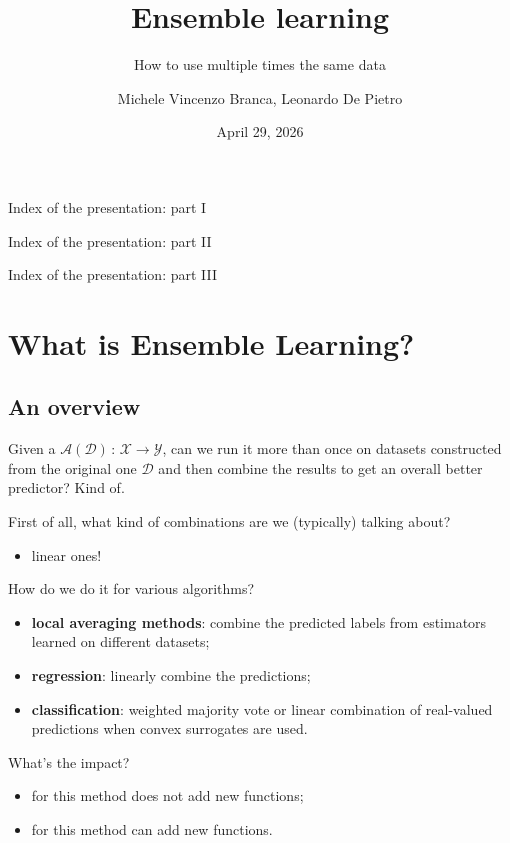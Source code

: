 \documentclass[
11pt,notheorems,hyperref={pdfauthor=whatever}
]{beamer}
\title[
]{Ensemble learning}
\subtitle{How to use multiple times the same data}
\author[
]{
    Michele Vincenzo Branca, Leonardo De Pietro
}
\institute{
    Collegio Carlo Alberto, \\
    University of Turin}
\date{April 29, 2026}
\begin{document}
{
\begin{frame}
  \titlepage
\end{frame}
}
\addtocounter{framenumber}{-1}

\begin{frame}{Index of the presentation: part I}
    \tableofcontents[part=1]
\end{frame}
\begin{frame}{Index of the presentation: part II}
    \tableofcontents[part=2]
\end{frame}
\begin{frame}{Index of the presentation: part III}
    \tableofcontents[part=3]
\end{frame}


\justifying
\section{What is Ensemble Learning?}
\subsection{An overview}
\begin{frame}
    Given a  \(\mathcal{A}(\mathcal{D})\,:\,\mathcal{X}\to\mathcal{Y}\), can we run it more than once on datasets constructed from the original one \(\mathcal{D}\) and then combine the results to get an overall better predictor? Kind of.
    
    First of all, what kind of combinations are we (typically) talking about?
    \begin{itemize}
        \item linear ones!
    \end{itemize}
    How do we do it for various algorithms?
    \begin{itemize}
        \item \alert{\textbf{local averaging methods}}: combine the predicted labels from estimators learned on different datasets;
        \item \alert{\textbf{regression}}: linearly combine the predictions;
        \item \alert{\textbf{classification}}: weighted majority vote or linear combination of real-valued predictions when convex surrogates are used.
    \end{itemize}
    What's the impact?
    \begin{itemize}
    \item for  this method does not add new functions;
    \item for  this method can add new functions. 
\end{itemize}
\end{frame}
\end{document}
